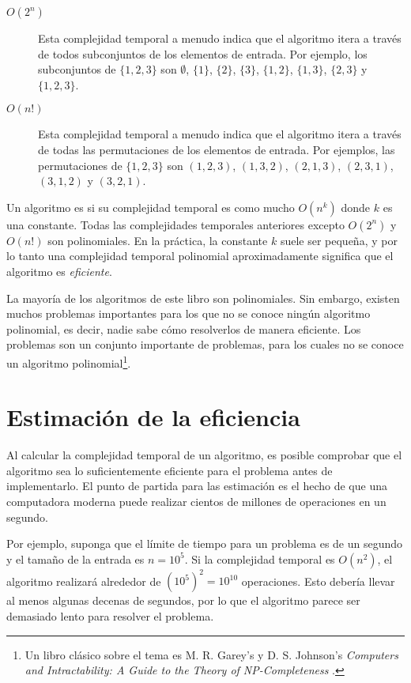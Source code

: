 \begin{description}
\item[$O(2^n)$]
Esta complejidad temporal a menudo indica que
el algoritmo itera a través de todos
subconjuntos de los elementos de entrada.
Por ejemplo, los subconjuntos de $\{1,2,3\}$ son
$\emptyset$, $\{1\}$, $\{2\}$, $\{3\}$, $\{1,2\}$,
$\{1,3\}$, $\{2,3\}$ y $\{1,2,3\}$.

\item[$O(n!)$]
Esta complejidad temporal a menudo indica que
el algoritmo itera a través de todas las
permutaciones de los elementos de entrada.
Por ejemplos, las permutaciones de $\{1,2,3\}$ son
$(1,2,3)$, $(1,3,2)$, $(2,1,3)$, $(2,3,1)$,
$(3,1,2)$ y $(3,2,1)$.

\end{description}

Un algoritmo es 
si su complejidad temporal es como mucho $O(n^k)$
donde $k$ es una constante.
Todas las complejidades temporales anteriores excepto
$O(2^n)$ y $O(n!)$ son polinomiales.
En la práctica, la constante $k$ suele ser pequeña,
y por lo tanto una complejidad temporal polinomial
aproximadamente significa que el algoritmo es \emph{eficiente}.


La mayoría de los algoritmos de este libro son polinomiales.
Sin embargo, existen muchos problemas importantes para los que
no se conoce ningún algoritmo polinomial, es decir,
nadie sabe cómo resolverlos de manera eficiente.
Los problemas  son un conjunto importante
de problemas, para los cuales no se conoce un algoritmo
polinomial\footnote{Un libro clásico sobre el tema es
M. R. Garey's y D. S. Johnson's
\emph{Computers and Intractability: A Guide to the Theory
of NP-Completeness} \cite{gar79}.}.

\section{Estimación de la eficiencia}

Al calcular la complejidad temporal de un algoritmo,
es posible comprobar que el algoritmo sea
lo suficientemente eficiente para el problema antes de implementarlo.
El punto de partida para las estimación es el hecho de que
una computadora moderna puede realizar cientos de
millones de operaciones en un segundo.

Por ejemplo, suponga que el límite de tiempo para
un problema es de un segundo y el tamaño de la entrada es $n=10^5$.
Si la complejidad temporal es $O(n^2)$,
el algoritmo realizará alrededor de $(10^5)^2=10^{10}$ operaciones.
Esto debería llevar al menos algunas decenas de segundos,
por lo que el algoritmo parece ser demasiado lento para resolver el problema.

